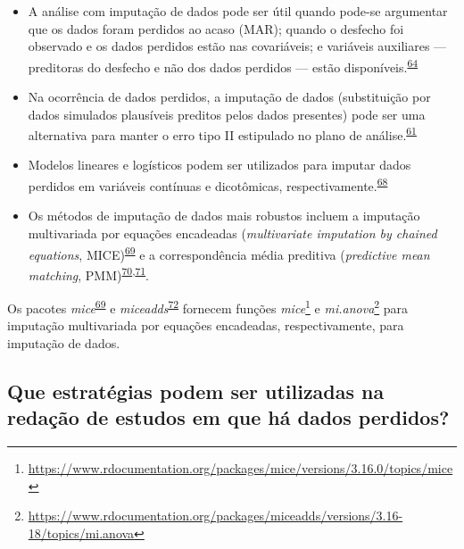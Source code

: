 \documentclass[
  a4paper,
]{book}
\renewcommand{\href}[2]{#2\footnote{\url{#1}}}
\newenvironment{infobox}[1]
  {
  \begin{itemize}
  \renewcommand{\labelitemi}{
    \raisebox{-.7\height}[0pt][0pt]{
      {\setkeys{Gin}{width=3em,keepaspectratio}
        \texttt{[image: \#1]}}
    }
  }
  \setlength{\fboxsep}{1em}
  \begin{blackbox}
  \item
  }
  {
  \end{blackbox}
  \end{itemize}
  }
\begin{document}
\begin{itemize}
\item
  A análise com imputação de dados pode ser útil quando pode-se argumentar que os dados foram perdidos ao acaso (MAR); quando o desfecho foi observado e os dados perdidos estão nas covariáveis; e variáveis auxiliares --- preditoras do desfecho e não dos dados perdidos --- estão disponíveis.\textsuperscript{\protect\hyperlink{ref-carpenter2021}{64}}
\item
  Na ocorrência de dados perdidos, a imputação de dados (substituição por dados simulados plausíveis preditos pelos dados presentes) pode ser uma alternativa para manter o erro tipo II estipulado no plano de análise.\textsuperscript{\protect\hyperlink{ref-Altman2007}{61}}
\item
  Modelos lineares e logísticos podem ser utilizados para imputar dados perdidos em variáveis contínuas e dicotômicas, respectivamente.\textsuperscript{\protect\hyperlink{ref-austin2023}{68}}
\item
  Os métodos de imputação de dados mais robustos incluem a imputação multivariada por equações encadeadas (\emph{multivariate imputation by chained equations}, MICE)\textsuperscript{\protect\hyperlink{ref-mice}{69}} e a correspondência média preditiva (\emph{predictive mean matching}, PMM)\textsuperscript{\protect\hyperlink{ref-rubin1986}{70},\protect\hyperlink{ref-little1988a}{71}}.
\end{itemize}

\begin{infobox}{images/Rlogo}
Os pacotes \emph{mice}\textsuperscript{\protect\hyperlink{ref-mice}{69}} e \emph{miceadds}\textsuperscript{\protect\hyperlink{ref-miceadds}{72}} fornecem funções \href{https://www.rdocumentation.org/packages/mice/versions/3.16.0/topics/mice}{\emph{mice}} e \href{https://www.rdocumentation.org/packages/miceadds/versions/3.16-18/topics/mi.anova}{\emph{mi.anova}} para imputação multivariada por equações encadeadas, respectivamente, para imputação de dados.

\end{infobox}

\hypertarget{que-estratuxe9gias-podem-ser-utilizadas-na-redauxe7uxe3o-de-estudos-em-que-huxe1-dados-perdidos}{%
\subsection{Que estratégias podem ser utilizadas na redação de estudos em que há dados perdidos?}\label{que-estratuxe9gias-podem-ser-utilizadas-na-redauxe7uxe3o-de-estudos-em-que-huxe1-dados-perdidos}}
\end{document}
